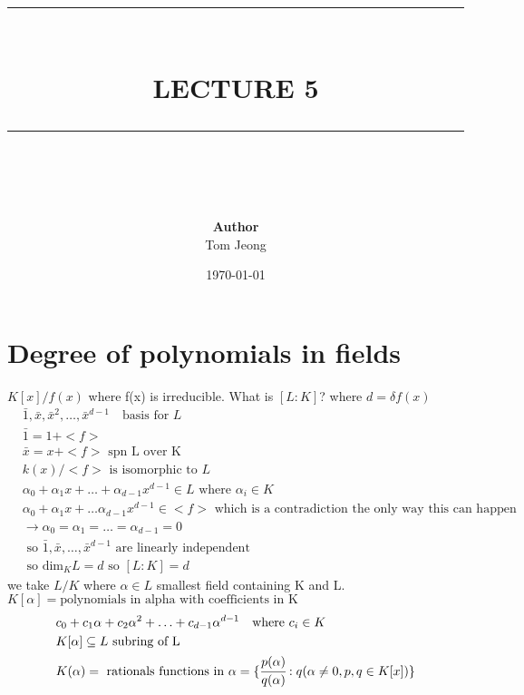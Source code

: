 \documentclass{article}
\newcommand{\HRule}[1]{\rule{\linewidth}{#1}}
\begin{document}

\title{ \normalsize \textsc{}
		\\ [2.0cm]
		\HRule{1.5pt} \\
		\LARGE \textbf{\uppercase{Lecture 5}}
		\HRule{2.0pt} \\ [0.6cm] \LARGE{}
		}

\date{\today}
\author{\textbf{Author} \\ 
		Tom Jeong
        }

\maketitle

\tableofcontents
\newpage

\section{Degree of polynomials in fields}
$K[x] / f(x)$ where f(x) is irreducible. What is $[L:K]$? where $d= \delta f(x)$
\begin{align*}
    &\bar{1}, \bar{x}, \bar{x}^2, \ldots, \bar{x}^{d-1} \quad \text{basis for } L \\
    &\bar{1} = 1 + <f> \\ 
    &\bar{x} = x + <f> \text{ spn L over K} \\
    &k(x) / <f> \text{ is isomorphic to } L \\
    &\alpha_0 + \alpha_1x + \ldots + \alpha_{d-1}x^{d-1} \in L \text{ where } \alpha_i \in K \\
    &\alpha_0 + \alpha_1 x + \dots \alpha_{d-1}x^{d-1}\in <f> \text{ which is a contradiction the only way this can happen } \\ 
    &\rightarrow \alpha_0 = \alpha_1 = \ldots = \alpha_{d-1} = 0 \\ 
    &\text{ so } \bar{1}, \bar{x}, \ldots, \bar{x}^{d-1} \text{ are linearly independent} \\
    &\text{ so } \text{dim}_K L = d \text{ so } [L:K] = d
\end{align*}
we take $L / K$ where $\alpha \in L$ smallest field containing K and L.\\ 
$K[\alpha] = \text {polynomials in alpha with coefficients in K}$ \\ 
\begin{align*}
    &c_0 + c_1 \alpha + c_2 \alpha^2 + \ldots + c_{d-1}\alpha^{d-1} \quad \text{where } c_i \in K \\
    &K[\alpha] \subseteq L \text{ subring of L} \\ 
    &K(\alpha) = \text { rationals functions in } \alpha = \{\cfrac{p(\alpha)}{q(\alpha) }: q(\alpha \not = 0, p,q \in K[x])\} 
\end{align*}
\end{document}
